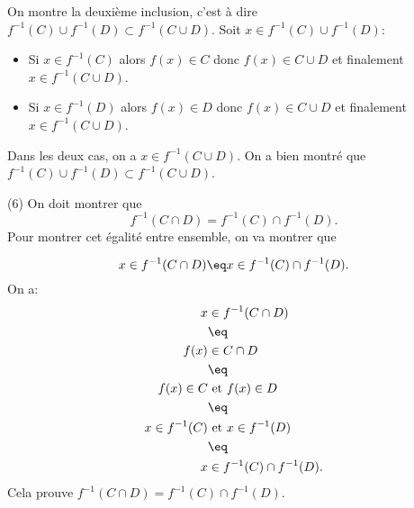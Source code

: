 \documentclass[12pt, a4paper,oneside]{article} %
\begin{document}
On montre la deuxième inclusion,
c'est à dire
$ 
f^{-1} (C) \cup f^{-1}(D)
\subset
f^{-1} (C \cup D)
$.
Soit $ x \in
f^{-1} (C) \cup f^{-1}(D)
$:
\begin{itemize}
	\item 
		Si $ x \in f^{-1} (C) $
		alors $ f(x) \in C $
		donc $ f(x) \in C \cup D $
		et finalement
		$ x \in f^{-1} (C \cup D) $.
	\item 
		Si $ x \in f^{-1} (D) $
		alors $ f(x) \in D $
		donc $ f(x) \in C \cup D $
		et finalement
		$ x \in f^{-1} (C \cup D) $.
\end{itemize}
Dans les deux cas,
on a 
$ x \in f^{-1} (C \cup D) $.
On a bien montré que
$ 
f^{-1} (C) \cup f^{-1}(D)
\subset
f^{-1} (C \cup D)
$.

(6) On doit montrer que
\begin{equation}
	f^{-1} ( C \cap D )
	=
	f^{-1} (C)
	\cap
	f^{-1} (D)
	.
\end{equation}
Pour montrer cet égalité entre ensemble,
on va montrer que

\begin{equation}
	x \in
	f^{-1} ( C \cap D )
	\eq
	x \in
	f^{-1} (C)
	\cap
	f^{-1} (D)
	.
\end{equation}
On a:
\begin{align}
	x
	& \in
	f^{-1} ( C \cap D )
	\\
	& \eq
	\\
	f(x)
	& \in
	C \cap D
	\\
	& \eq
	\\
	f(x)
	\in
	C
	& \text{ et }
	f(x)
	\in
	D
	\\
	& \eq
	\\
	x
	\in
	f^{-1} (C)
	& \text{ et }
	x
	\in
	f^{-1} (D)
	\\
	& \eq
	\\
	x
	& \in
	f^{-1} (C)
	\cap
	f^{-1} (D)
	.
\end{align}
Cela prouve
$ 
f^{-1} ( C \cap D )
=
f^{-1} (C)
\cap
f^{-1} (D)
$.


\end{document}
